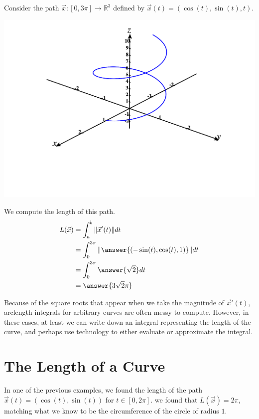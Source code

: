 \documentclass{ximera}
\begin{document}
\begin{example}
Consider the path $\vec{x}:[0,3\pi]\rightarrow\mathbb{R}^3$ defined by $\vec{x}(t) = (\cos(t),\sin(t),t)$.

\begin{image}
\includegraphics[width = \textwidth]{CalcPlot3D-spiral}
\end{image}

We compute the length of this path.
\begin{align*}
L(\vec{x}) &= \int_a^b\|\vec{x}'(t)\|dt\\
&= \int_{0}^{3\pi} \|\answer{(-\sin(t),\cos(t),1)}\|dt\\
&= \int_{0}^{3\pi} \answer{\sqrt{2}}dt\\
&= \answer{3\sqrt{2}\pi}
\end{align*}
\end{example}

Because of the square roots that appear when we take the magnitude of $\vec{x}'(t)$, arclength integrals for arbitrary curves are often messy to compute. However, in these cases, at least we can write down an integral representing the length of the curve, and perhaps use technology to either evaluate or approximate the integral.

\section*{The Length of a Curve}

In one of the previous examples, we found the length of the path $\vec{x}(t) = (\cos(t),\sin(t))$ for $t\in [0,2\pi]$. we found that $L(\vec{x}) = 2\pi$, matching what we know to be the circumference of the circle of radius $1$.
\end{document}
